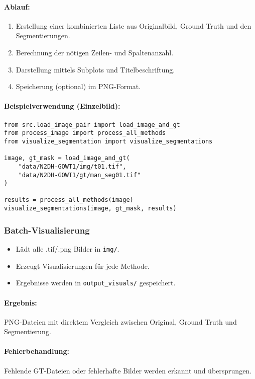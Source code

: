 \documentclass[a4paper,12pt]{article}
\begin{document}
\paragraph{Ablauf:}
\begin{enumerate}
    \item Erstellung einer kombinierten Liste aus Originalbild, Ground Truth und den Segmentierungen.
    \item Berechnung der nötigen Zeilen- und Spaltenanzahl.
    \item Darstellung mittels Subplots und Titelbeschriftung.
    \item Speicherung (optional) im PNG-Format.
\end{enumerate}

\paragraph{Beispielverwendung (Einzelbild):}

\begin{verbatim}
from src.load_image_pair import load_image_and_gt
from process_image import process_all_methods
from visualize_segmentation import visualize_segmentations

image, gt_mask = load_image_and_gt(
    "data/N2DH-GOWT1/img/t01.tif",
    "data/N2DH-GOWT1/gt/man_seg01.tif"
)

results = process_all_methods(image)
visualize_segmentations(image, gt_mask, results)
\end{verbatim}

\subsubsection*{Batch-Visualisierung}
\begin{itemize}
    \item Lädt alle .tif/.png Bilder in \texttt{img/}.
    \item Erzeugt Visualisierungen für jede Methode.
    \item Ergebnisse werden in \texttt{output\_visuals/} gespeichert.
\end{itemize}

\paragraph{Ergebnis:} PNG-Dateien mit direktem Vergleich zwischen Original, Ground Truth und Segmentierung.

\paragraph{Fehlerbehandlung:} Fehlende GT-Dateien oder fehlerhafte Bilder werden erkannt und übersprungen.
\end{document}
